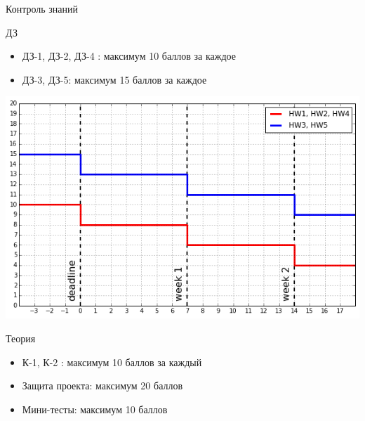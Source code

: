 \documentclass[aspectratio=169]{beamer}
\begin{document}
\begin{frame}{Контроль знаний}

\begin{block}{ДЗ}
\begin{itemize}
\item ДЗ-1, ДЗ-2, ДЗ-4 : максимум 10 баллов за каждое
\item ДЗ-3, ДЗ-5: максимум 15 баллов за каждое
\end{itemize}
\end{block}

\begin{center}
\includegraphics[scale=0.2]{images/hw.png}
\end{center}

\begin{alertblock}{Теория}
\begin{itemize}
\item К-1, К-2 : максимум 10 баллов за каждый
\item Защита проекта: максимум 20 баллов
\item Мини-тесты: максимум 10 баллов
\end{itemize}
\end{alertblock}

\end{frame}
\end{document}
